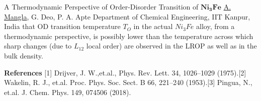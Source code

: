 \begin{abstract_online}{A Thermodynamic Perspective of Order-Disorder Transition of $\mathbf{Ni_3Fe}$ }{%
        \underline{A. Mangla}, G. Deo, P. A. Apte}{%
        }{%
        Department of Chemical Engineering, IIT Kanpur, India}
that OD transition temperature $T_O$ in the actual $Ni_3Fe$ alloy, from a thermodynamic perspective, is possibly lower than the temperature across which sharp changes (due to $L_{12}$ local order) are observed in the LROP as well as in the bulk density.  
    
        \textbf{References} \newline{}[1] Drijver, J. W.,et.al., Phys. Rev. Lett. 34, 1026–1029 (1975).\newline{}[2]	Wakelin, R. J., et.al. Proc. Phys. Soc. Sect. B 66, 221–240 (1953).\newline{}[3]	Pingua, N., et.al. J. Chem. Phys. 149, 074506 (2018).
    \end{abstract_online}
    